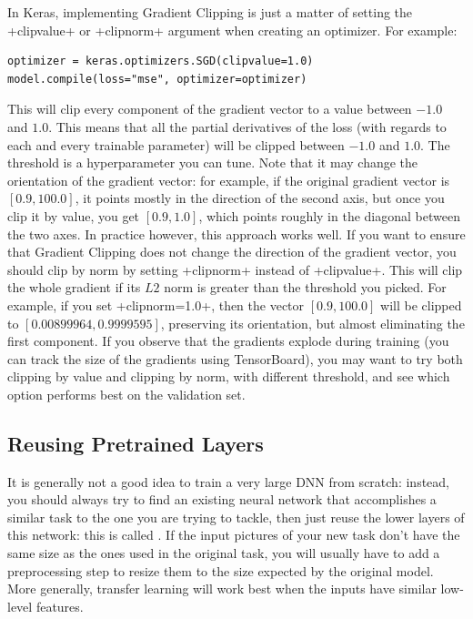 In Keras, implementing Gradient Clipping is just a matter of setting the \cd+clipvalue+ or \cd+clipnorm+ argument when creating an optimizer. For example:
\begin{lstlisting}
optimizer = keras.optimizers.SGD(clipvalue=1.0)
model.compile(loss="mse", optimizer=optimizer)
\end{lstlisting}
This will clip every component of the gradient vector to a value between $-1.0$ and $1.0$. This means that all the partial derivatives of the loss (with regards to each and every trainable parameter) will be clipped between $-1.0$ and $1.0$. The threshold is a hyperparameter you can tune. Note that it may change the orientation of the gradient vector: for example, if the original gradient vector is $[0.9, 100.0]$, it points mostly in the direction of the second axis, but once you clip it by value, you get $[0.9, 1.0]$, which points roughly in the diagonal between the two axes. In practice however, this approach works well. If you want to ensure that Gradient Clipping does not change the direction of the gradient vector, you should clip by norm by setting \cd+clipnorm+ instead of \cd+clipvalue+. This will clip the whole gradient if its $L2$ norm is greater than the threshold you picked. For example, if you set \cd+clipnorm=1.0+, then the vector $[0.9, 100.0]$ will be clipped to $[0.00899964, 0.9999595]$, preserving its orientation, but almost eliminating the first component. If you observe that the gradients explode during training (you can track the size of the gradients using TensorBoard), you may want to try both clipping by value and clipping by norm, with different threshold, and see which option performs best on the validation set.

\subsection{Reusing Pretrained Layers}
It is generally not a good idea to train a very large DNN from scratch: instead, you should always try to find an existing neural network that accomplishes a similar task to the one you are trying to tackle, then just reuse the lower layers of this network: this is called . If the input pictures of your new task don't have the same size as the ones used in the original task, you will usually have to add a preprocessing step to resize them to the size expected by the original model. More generally, transfer learning will work best when the inputs have similar low-level features.

